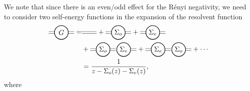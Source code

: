 \documentclass[aps,pra,groupedaddress,twocolumn,notitlepage,superscriptaddress,10pt]{revtex4-1}
\begin{document}
We note that since there is an even/odd effect for the R\'enyi negativity, we need to consider two self-energy functions in the expansion of the resolvent function
\begin{align}
    \tikz[baseline=-0.5ex]{
    \draw[densely dotted,thick] (0.35,0.05)--(0.65,0.05);
    \draw[densely dotted,thick] (-0.35,0.05)--(-0.65,0.05);
    \draw (0.35,-0.05)--(0.65,-0.05);
    \draw (-0.35,-0.05)--(-0.65,-0.05);
    \draw[thick] (0,0) circle (10pt) node[anchor=center] {$G$};
    }
    =&
   \tikz[baseline=-0.5ex]{
    \draw[densely dotted,thick] (-0.4,0.05)--(0.35,0.05);
    \draw (-0.4,-0.05)--(0.35,-0.05);
    }
    +
    \tikz[baseline=-0.5ex]{
    \draw[densely dotted,thick] (0.35,0.05)--(0.65,0.05);
    \draw[densely dotted,thick] (-0.35,0.05)--(-0.65,0.05);
    \draw (0.35,-0.05)--(0.65,-0.05);
    \draw (-0.35,-0.05)--(-0.65,-0.05);
    \draw[thick] (0,0) circle (10pt) node[anchor=center] {$\Sigma_o$};
    }
    +
    \tikz[baseline=-0.5ex]{
    \draw[densely dotted,thick] (0.35,0.05)--(0.65,0.05);
    \draw[densely dotted,thick] (-0.35,0.05)--(-0.65,0.05);
    \draw (0.35,-0.05)--(0.65,-0.05);
    \draw (-0.35,-0.05)--(-0.65,-0.05);
    \draw[thick] (0,0) circle (10pt) node[anchor=center] {$\Sigma_e$};
    }
    \nonumber \\
    &+
    \tikz[baseline=-0.5ex]{
    \draw[densely dotted,thick] (0.35,0.05)--(0.65,0.05);
    \draw[densely dotted,thick] (-0.35,0.05)--(-0.65,0.05);
    \draw (0.35,-0.05)--(0.65,-0.05);
    \draw (-0.35,-0.05)--(-0.65,-0.05);
    \draw[thick] (0,0) circle (10pt) node[anchor=center] {$\Sigma_o$};
    \draw[thick] (1.05,0) circle (10pt) node[anchor=center] {$\Sigma_e$};
    \draw[densely dotted,thick] (1.4,0.05)--(1.7,0.05);
    \draw (1.4,-0.05)--(1.7,-0.05);
    }
+
   \tikz[baseline=-0.5ex]{
    \draw[densely dotted,thick] (0.35,0.05)--(0.65,0.05);
    \draw[densely dotted,thick] (-0.35,0.05)--(-0.65,0.05);
    \draw (0.35,-0.05)--(0.65,-0.05);
    \draw (-0.35,-0.05)--(-0.65,-0.05);
    \draw[thick] (0,0) circle (10pt) node[anchor=center] {$\Sigma_e$};
    \draw[thick] (1.05,0) circle (10pt) node[anchor=center] {$\Sigma_o$};
    \draw[densely dotted,thick] (1.4,0.05)--(1.7,0.05);
    \draw (1.4,-0.05)--(1.7,-0.05);
    }
    + \cdots \nonumber \\
      &=\frac{1}{z- \Sigma_o(z) - \Sigma_e(z)},
      \label{eq:geometric}
\end{align}
where 
\end{document}
